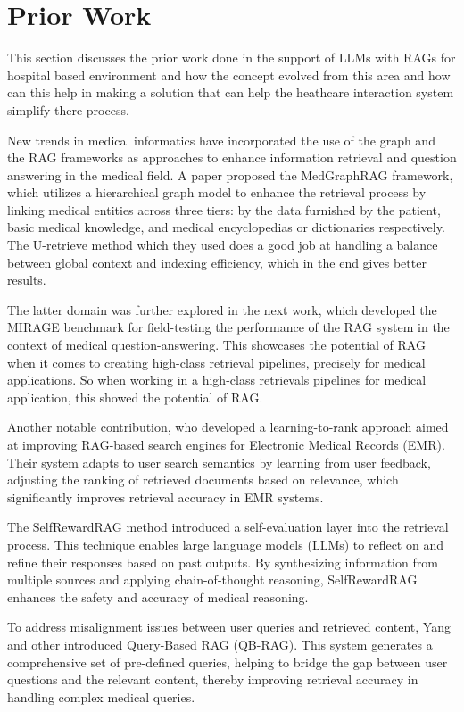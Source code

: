 \section{Prior Work}
This section discusses the prior work done in the support of LLMs with RAGs for hospital based environment and how the concept evolved from this area and how can this help in making a solution that can help the heathcare interaction system simplify there process.

New trends in medical informatics have incorporated the use of the graph and the RAG frameworks as approaches to enhance information retrieval and question answering in the medical field. A paper proposed the MedGraphRAG framework\cite{wu2024medicalgraphragsafe}, which utilizes a hierarchical graph model to enhance the retrieval process by linking medical entities across three tiers: by the data furnished by the patient, basic medical knowledge, and medical encyclopedias or dictionaries respectively.  The U-retrieve method which they used does a good job at handling a balance between global context and indexing efficiency, which in the end gives better results.

The latter domain was further explored in the next work, which developed the MIRAGE benchmark\cite{xiong2024benchmarkingretrievalaugmentedgenerationmedicine} for field-testing the performance of the RAG system in the context of medical question-answering. This showcases the potential of RAG when it comes to creating high-class retrieval pipelines, precisely for medical applications. So when working in a high-class retrievals pipelines for medical application, this showed the potential of RAG\@.

Another notable contribution, who developed a learning-to-rank approach\cite{YE202493} aimed at improving RAG-based search engines for Electronic Medical Records (EMR). Their system adapts to user search semantics by learning from user feedback, adjusting the ranking of retrieved documents based on relevance, which significantly improves retrieval accuracy in EMR systems.

The SelfRewardRAG method\cite{10620139} introduced a self-evaluation layer into the retrieval process. This technique enables large language models (LLMs) to reflect on and refine their responses based on past outputs. By synthesizing information from multiple sources and applying chain-of-thought reasoning, SelfRewardRAG enhances the safety and accuracy of medical reasoning.

To address misalignment issues between user queries and retrieved content, Yang and other introduced Query-Based RAG (QB-RAG)\cite{yang2024geometryqueriesquerybasedinnovations}. This system generates a comprehensive set of pre-defined queries, helping to bridge the gap between user questions and the relevant content, thereby improving retrieval accuracy in handling complex medical queries.

